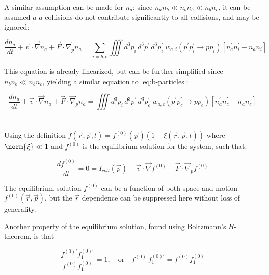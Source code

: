 \documentclass{template}
\begin{document}
A similar assumption can be made for $n_a$: since $n_an_b \ll n_bn_b\ll n_bn_c$, it can be assumed $a$-$a$ collisions do not contribute significantly to all collisions, and may be ignored:

\begin{equation}
    \frac{dn_a}{dt} + \vec{v}\cdot\vec{\nabla}n_a + \vec{F}\cdot\vec{\nabla}_p n_a = \sum_{i=b,c} \iiint d^3p_i\, d^3p^\prime \, d^3p_i^\prime \; w_{a,i}(p^\prime p_i^\prime \rightarrow pp_i )\left[    n_a^\prime n_i^\prime - n_an_i\right]
\end{equation}

This equation is already linearized, but can be further simplified since $n_bn_b\ll n_bn_c$, yielding a similar equation to \autoref{eq:b-particles}:

\begin{equation}\label{eq:a-particles}
\boxed{    \frac{dn_a}{dt} + \vec{v}\cdot\vec{\nabla}n_a + \vec{F}\cdot\vec{\nabla}_p n_a =  \iiint d^3p_i\, d^3p^\prime \, d^3p_c^\prime \; w_{a,c}(p^\prime p_c^\prime \rightarrow pp_c )\left[    n_a^\prime n_c^\prime - n_an_c \right]}
\end{equation}

\section{}

Using the definition $f(\vec{r}, \vec{p}, t) = f^{(0)}(\vec{p})\left(1 + \xi (\vec{r}, \vec{p}, t)\right)$ where $\norm{\xi} \ll 1$ and $f^{(0)}$ is the equilibrium solution for the system, such that:

\begin{equation}\label{eq:equilibrium-definition}
    \frac{df^{(0)}}{dt} = 0 = I_{coll}(\vec{p}) - \vec{v}\cdot\vec{\nabla}f^{(0)} - \vec{F}\cdot\vec{\nabla}_p f^{(0)}
\end{equation}

The equilibrium solution $f^{(0)}$ can be a function of both space and motion $f^{(0)}(\vec{r}, \vec{p})$, but the $\vec{r}$ dependence can be suppressed here without loss of generality.

Another property of the equilibrium solution, found using Boltzmann's $H$-theorem, is that

\begin{equation}\label{eq:equlibrium-scattering-property}
    \frac{f^{(0)\prime} f^{(0)\prime}_1}{f^{(0)} f^{(0)}_1} = 1, \quad\text{or} \quad f^{(0)\prime} f^{(0)\prime}_1 = f^{(0)} f^{(0)}_1
\end{equation}
\end{document}
